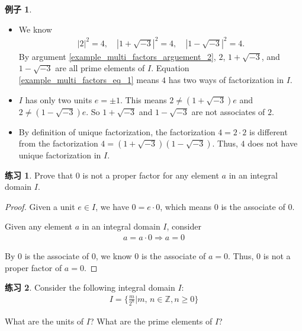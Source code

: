 \documentclass[utf8]{ctexbook}
\theoremstyle{definition}
\newtheorem{example}{例子}[section]
\newtheorem{exercise}{练习}[section]
\begin{document}
\begin{example}
\begin{enumerate}
{\begin{itemize}
\item{We know
\begin{align*}
|2|^2 = 4, \quad |1 + \sqrt{-3}|^2 = 4, \quad |1 - \sqrt{-3}|^2 = 4 .
\end{align*}
By argument \ref{example_multi_factors_arguement_2}, $2$, $1+ \sqrt{-3}$, and $1 - \sqrt{-3}$ are all prime elements of $I$. Equation \ref{example_multi_factors_eq_1} means $4$ has two ways of factorization in $I$.
}
\item{$I$ has only two units $e = \pm 1$. This means $ 2 \neq (1+ \sqrt{-3}) e $ and $2 \neq (1 - \sqrt{-3}) e$. So $1+ \sqrt{-3}$ and $1 - \sqrt{-3}$ are not associates of $2$. }
\item{By definition of unique factorization, the factorization $4 = 2 \cdot 2$ is different from the factorization $4 = (1+ \sqrt{-3} ) (1 - \sqrt{-3})$. Thus, $4$ does not have unique factorization in $I$.}
\end{itemize}
}

\end{enumerate}

\end{example}

\begin{exercise}
Prove that $0$ is not a proper factor for any element $a$ in an integral domain $I$. 
\end{exercise}

\begin{proof}
Given a unit $e \in I$, we have $ 0 = e \cdot 0$, which means $0$ is the associate of $0$.

Given any element $a $ in an integral domain $I$, consider
\begin{align*}
a = a \cdot 0 \Longrightarrow a = 0
\end{align*}

By $0$ is the associate of $0$, we know $0$ is the associate of $a=0$. Thus, $0$ is not a proper factor of $a = 0$.

\end{proof}


\begin{exercise}\label{integral_domain_unique_factorization_exercise_2}
Consider the following integral domain $I$:
\begin{align*}
I = \{ \frac{m}{2^n}  | m, \, n  \in \mathbb{Z}, n \geq 0 \}
\end{align*}

What are the units of $I$? What are the prime elements of $I$?
\end{exercise}
\end{document}
